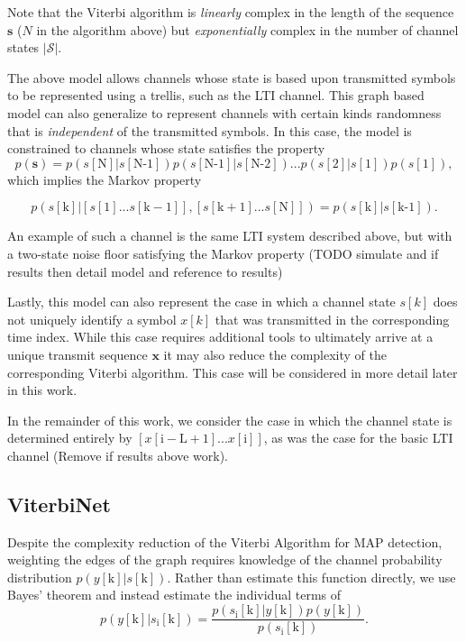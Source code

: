 Note that the Viterbi algorithm is \emph{linearly} complex in the length of the sequence $\mathbf{s}$ ($N$ in the algorithm above) but \emph{exponentially} complex in the number of channel states $|\mathcal{S}|$. 
\par
The above model allows channels whose state is based upon transmitted symbols to be represented using a trellis, such as the LTI channel. This graph based model can also generalize to represent channels with certain kinds randomness that is \emph{independent} of the transmitted symbols. In this case, the model is constrained to channels whose state satisfies the property
\begin{equation*}
p(\mathbf{s}) = p(s[\text{N}]|s[\text{N-1}]) p(s[\text{N-1}]|s[\text{N-2}])... p(s[\text{2}]|s[\text{1}])p(s[\text{1}]),
\end{equation*}
which implies the Markov property

\begin{equation*}
p(s[\text{k}]|\left[s[\mathrm{1}]...s[\mathrm{k-1}]\right],\left[s[\mathrm{k+1}]...s[\mathrm{N}]\right]) = p(s[\text{k}]|s[\text{k-1}]).
\end{equation*}

An example of such a channel is the same LTI system described above, but with a two-state noise floor satisfying the Markov property (TODO simulate and if results then detail model and reference to results)
\par
Lastly, this model can also represent the case in which a channel state $s[k]$ does not uniquely identify a symbol $x[k]$ that was transmitted in the corresponding time index. While this case requires additional tools to ultimately arrive at a unique transmit sequence $\mathbf{x}$ it may also reduce the complexity of the corresponding Viterbi algorithm. This case will be considered in more detail later in this work.
\par
In the remainder of this work, we consider the case in which the  channel state is determined entirely by $\left[x[\mathrm{i-L+1}]...x[\mathrm{i}]\right]$, as was the case for the basic LTI channel (Remove if results above work). 

\subsection{ViterbiNet}

Despite the complexity reduction of the Viterbi Algorithm for MAP detection, weighting the edges of the graph requires knowledge of the channel probability distribution $p(y[\mathrm{k}]|s[\mathrm{k}])$. Rather than estimate this function directly, we use Bayes' theorem and instead estimate the individual terms of
\begin{equation*}
p(y[\mathrm{k}]|s_{\text{i}}[\text{k}]) = 
\frac
{p(s_{\text{i}}[\text{k}]|y[\mathrm{k}])p(y[\mathrm{k}])}
{p(s_{\text{i}}[\text{k}])}.
\end{equation*}

